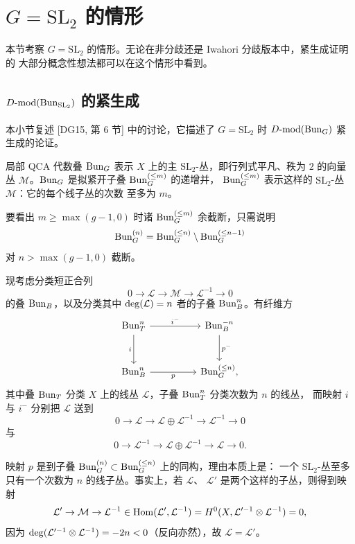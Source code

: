 
\section{\texorpdfstring{$G=\mathrm{SL}_2$ 的情形}{G=SL2 的情形}}
\label{sec:sl2}

本节考察 $G=\mathrm{SL}_2$ 的情形。无论在非分歧还是 Iwahori 分歧版本中，紧生成证明的
大部分概念性想法都可以在这个情形中看到。

\subsection{\texorpdfstring{$D\text{-}\mathrm{mod}(\mathrm{Bun}_{\mathrm{SL}_2})$ 的紧生成}{D-mod(SL2) 的紧生成}}
\label{sec:sl2-unram}

本小节复述 [DG15, 第 6 节] 中的讨论，它描述了 $G=\mathrm{SL}_2$ 时
$D\text{-}\mathrm{mod}(\mathrm{Bun}_G)$ 紧生成的论证。

局部 QCA 代数叠 $\mathrm{Bun}_G$ 表示 $X$ 上的主 $\mathrm{SL}_2$-丛，即行列式平凡、秩为 $2$
的向量丛 $\mathcal{M}$。$\mathrm{Bun}_G$ 是拟紧开子叠 $\mathrm{Bun}^{(\le m)}_G$ 的递增并，
$\mathrm{Bun}^{(\le m)}_G$ 表示这样的 $\mathrm{SL}_2$-丛 $\mathcal{M}$：它的每个线子丛的次数
至多为 $m$。

要看出 $m\ge \max(g-1,0)$ 时诸 $\mathrm{Bun}^{(\le m)}_G$ 余截断，只需说明
\[
\mathrm{Bun}^{(n)}_G=\mathrm{Bun}^{(\le n)}_G\setminus\mathrm{Bun}^{(\le n-1)}_G
\]
对 $n>\max(g-1,0)$ 截断。

现考虑分类短正合列
\[
0\to \mathcal{L}\to \mathcal{M}\to \mathcal{L}^{-1}\to 0
\]
的叠 $\mathrm{Bun}_B$，以及分类其中 $\operatorname{deg}(\mathcal{L})=n$ 者的子叠 $\mathrm{Bun}^n_B$。有纤维方
\[
\begin{tikzcd}[column sep=huge,row sep=large]
\Bun^n_T \arrow[r,"i^-"] \arrow[d,"i"'] & \Bun^{-n}_B \arrow[d,"p^-"]\\
\Bun^n_B \arrow[r,"p"'] & \Bun^{(\le n)}_G,
\end{tikzcd}
\]
其中叠 $\mathrm{Bun}_T$ 分类 $X$ 上的线丛 $\mathcal{L}$，子叠 $\mathrm{Bun}^n_T$ 分类次数为 $n$ 的线丛，
而映射 $i$ 与 $i^-$ 分别把 $\mathcal{L}$ 送到
\[
0\to \mathcal{L}\to \mathcal{L}\oplus \mathcal{L}^{-1}\to \mathcal{L}^{-1}\to 0
\]
与
\[
0\to \mathcal{L}^{-1}\to \mathcal{L}\oplus \mathcal{L}^{-1}\to \mathcal{L}\to 0.
\]

映射 $p$ 是到子叠 $\mathrm{Bun}^{(n)}_G\subset \mathrm{Bun}^{(\le n)}_G$ 上的同构，理由本质上是：
一个 $\mathrm{SL}_2$-丛至多只有一个次数为 $n$ 的线子丛。事实上，若 $\mathcal{L}$、
$\mathcal{L}'$ 是两个这样的子丛，则得到映射
\[
\mathcal{L}'\to \mathcal{M}\to \mathcal{L}^{-1}\in \operatorname{Hom}(\mathcal{L}',\mathcal{L}^{-1})
=H^0(X,\mathcal{L}'^{-1}\otimes \mathcal{L}^{-1})=0,
\]
因为 $\operatorname{deg}(\mathcal{L}'^{-1}\otimes \mathcal{L}^{-1})=-2n<0$（反向亦然），故
$\mathcal{L}=\mathcal{L}'$。

